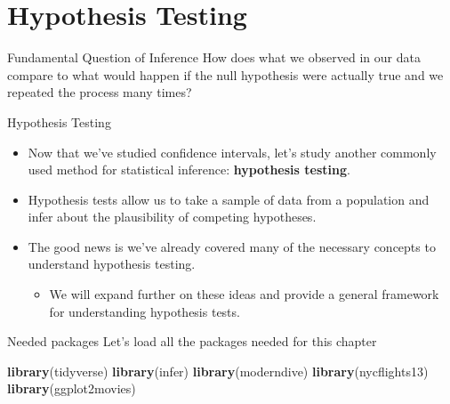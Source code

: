 \documentclass[
  ignorenonframetext,
]{beamer}
\newenvironment{Shaded}{\begin{snugshade}}{\end{snugshade}}
\newcommand{\FunctionTok}[1]{\textcolor[rgb]{0.13,0.29,0.53}{\textbf{#1}}}
\newcommand{\NormalTok}[1]{#1}
\providecommand{\tightlist}{%
  \setlength{\itemsep}{0pt}\setlength{\parskip}{0pt}}
\begin{document}
\hypertarget{hypothesis-testing}{%
\section{Hypothesis Testing}\label{hypothesis-testing}}

\begin{frame}{Fundamental Question of Inference}
\protect\hypertarget{fundamental-question-of-inference}{}
How does what we observed in our data compare to what would happen if
the null hypothesis were actually true and we repeated the process many
times?
\end{frame}

\begin{frame}{Hypothesis Testing}
\protect\hypertarget{hypothesis-testing-1}{}
\begin{itemize}
\item
  Now that we've studied confidence intervals, let's study another
  commonly used method for statistical inference: \textbf{hypothesis
  testing}.
\item
  Hypothesis tests allow us to take a sample of data from a population
  and infer about the plausibility of competing hypotheses.
\item
  The good news is we've already covered many of the necessary concepts
  to understand hypothesis testing.

  \begin{itemize}
  \tightlist
  \item
    We will expand further on these ideas and provide a general
    framework for understanding hypothesis tests.
  \end{itemize}
\end{itemize}
\end{frame}

\begin{frame}[fragile]{Needed packages}
\protect\hypertarget{needed-packages-1}{}
Let's load all the packages needed for this chapter

\small

\begin{Shaded}
\begin{Highlighting}[]
\FunctionTok{library}\NormalTok{(tidyverse)}
\FunctionTok{library}\NormalTok{(infer)}
\FunctionTok{library}\NormalTok{(moderndive)}
\FunctionTok{library}\NormalTok{(nycflights13)}
\FunctionTok{library}\NormalTok{(ggplot2movies)}
\end{Highlighting}
\end{Shaded}

\normalsize
\end{frame}
\end{document}
